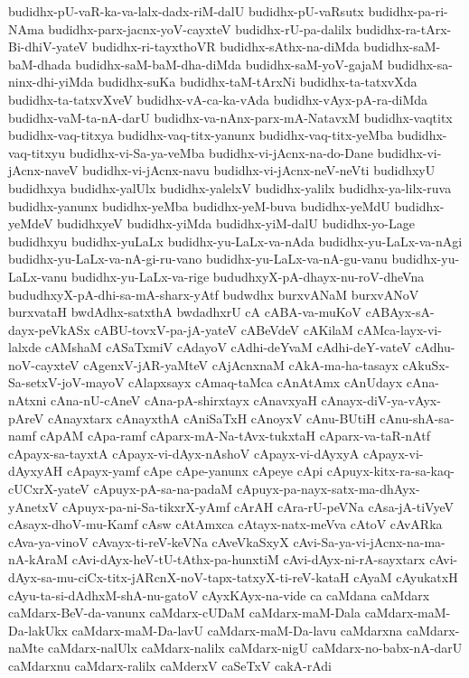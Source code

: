 {budidhx-pU-vaR-ka-va-lalx-dadx-riM-dalU
budidhx-pU-vaRsutx
budidhx-pa-ri-NAma
budidhx-parx-jacnx-yoV-cayxteV
budidhx-rU-pa-dalilx
budidhx-ra-tArx-Bi-dhiV-yateV
budidhx-ri-tayxthoVR
budidhx-sAthx-na-diMda
budidhx-saM-baM-dhada
budidhx-saM-baM-dha-diMda
budidhx-saM-yoV-gajaM
budidhx-sa-ninx-dhi-yiMda
budidhx-suKa
budidhx-taM-tArxNi
budidhx-ta-tatxvXda
budidhx-ta-tatxvXveV
budidhx-vA-ca-ka-vAda
budidhx-vAyx-pA-ra-diMda
budidhx-vaM-ta-nA-darU
budidhx-va-nAnx-parx-mA-NatavxM
budidhx-vaqtitx
budidhx-vaq-titxya
budidhx-vaq-titx-yanunx
budidhx-vaq-titx-yeMba
budidhx-vaq-titxyu
budidhx-vi-Sa-ya-veMba
budidhx-vi-jAcnx-na-do-Dane
budidhx-vi-jAcnx-naveV
budidhx-vi-jAcnx-navu
budidhx-vi-jAcnx-neV-neVti
budidhxyU
budidhxya
budidhx-yalUlx
budidhx-yalelxV
budidhx-yalilx
budidhx-ya-lilx-ruva
budidhx-yanunx
budidhx-yeMba
budidhx-yeM-buva
budidhx-yeMdU
budidhx-yeMdeV
budidhxyeV
budidhx-yiMda
budidhx-yiM-dalU
budidhx-yo-Lage
budidhxyu
budidhx-yuLaLx
budidhx-yu-LaLx-va-nAda
budidhx-yu-LaLx-va-nAgi
budidhx-yu-LaLx-va-nA-gi-ru-vano
budidhx-yu-LaLx-va-nA-gu-vanu
budidhx-yu-LaLx-vanu
budidhx-yu-LaLx-va-rige
bududhxyX-pA-dhayx-nu-roV-dheVna
bududhxyX-pA-dhi-sa-mA-sharx-yAtf
budwdhx
burxvANaM
burxvANoV
burxvataH
bwdAdhx-satxthA
bwdadhxrU
cA
cABA-va-muKoV
cABAyx-sA-dayx-peVkASx
cABU-tovxV-pa-jA-yateV
cABeVdeV
cAKilaM
cAMca-layx-vi-lalxde
cAMshaM
cASaTxmiV
cAdayoV
cAdhi-deYvaM
cAdhi-deY-vateV
cAdhu-noV-cayxteV
cAgenxV-jAR-yaMteV
cAjAcnxnaM
cAkA-ma-ha-tasayx
cAkuSx-Sa-setxV-joV-mayoV
cAlapxsayx
cAmaq-taMca
cAnAtAmx
cAnUdayx
cAna-nAtxni
cAna-nU-cAneV
cAna-pA-shirxtayx
cAnavxyaH
cAnayx-diV-ya-vAyx-pAreV
cAnayxtarx
cAnayxthA
cAniSaTxH
cAnoyxV
cAnu-BUtiH
cAnu-shA-sa-namf
cApAM
cApa-ramf
cAparx-mA-Na-tAvx-tukxtaH
cAparx-va-taR-nAtf
cApayx-sa-tayxtA
cApayx-vi-dAyx-nAshoV
cApayx-vi-dAyxyA
cApayx-vi-dAyxyAH
cApayx-yamf
cApe
cApe-yanunx
cApeye
cApi
cApuyx-kitx-ra-sa-kaq-cUCxrX-yateV
cApuyx-pA-sa-na-padaM
cApuyx-pa-nayx-satx-ma-dhAyx-yAnetxV
cApuyx-pa-ni-Sa-tikxrX-yAmf
cArAH
cAra-rU-peVNa
cAsa-jA-tiVyeV
cAsayx-dhoV-mu-Kamf
cAsw
cAtAmxca
cAtayx-natx-meVva
cAtoV
cAvARka
cAva-ya-vinoV
cAvayx-ti-reV-keVNa
cAveVkaSxyX
cAvi-Sa-ya-vi-jAcnx-na-ma-nA-kAraM
cAvi-dAyx-heV-tU-tAthx-pa-hunxtiM
cAvi-dAyx-ni-rA-sayxtarx
cAvi-dAyx-sa-mu-ciCx-titx-jARcnX-noV-tapx-tatxyX-ti-reV-kataH
cAyaM
cAyukatxH
cAyu-ta-si-dAdhxM-shA-nu-gatoV
cAyxKAyx-na-vide
ca
caMdana
caMdarx
caMdarx-BeV-da-vanunx
caMdarx-cUDaM
caMdarx-maM-Dala
caMdarx-maM-Da-lakUkx
caMdarx-maM-Da-lavU
caMdarx-maM-Da-lavu
caMdarxna
caMdarx-naMte
caMdarx-nalUlx
caMdarx-nalilx
caMdarx-nigU
caMdarx-no-babx-nA-darU
caMdarxnu
caMdarx-ralilx
caMderxV
caSeTxV
cakA-rAdi
}
